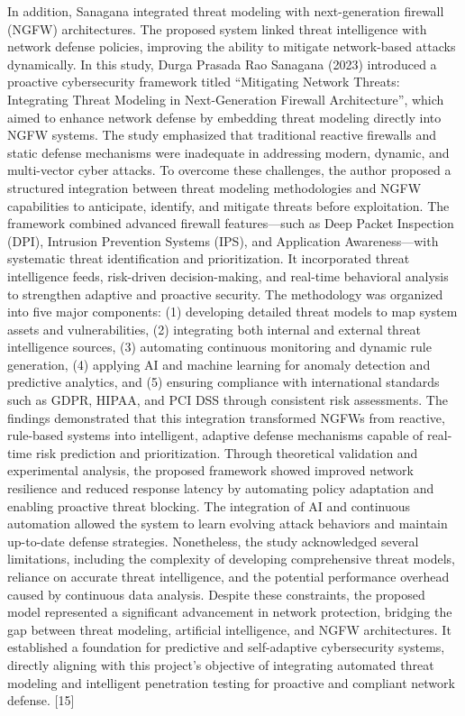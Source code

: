 \documentclass[12pt,a4paper]{report}
\begin{document}
In addition, Sanagana integrated threat modeling with next-generation firewall (NGFW) architectures. The proposed system linked threat intelligence with network defense policies, improving the ability to mitigate network-based attacks dynamically. In this study, Durga Prasada Rao Sanagana (2023) introduced a proactive cybersecurity framework titled “Mitigating Network Threats: Integrating Threat Modeling in Next-Generation Firewall Architecture”, which aimed to enhance network defense by embedding threat modeling directly into NGFW systems. The study emphasized that traditional reactive firewalls and static defense mechanisms were inadequate in addressing modern, dynamic, and multi-vector cyber attacks. To overcome these challenges, the author proposed a structured integration between threat modeling methodologies and NGFW capabilities to anticipate, identify, and mitigate threats before exploitation. The framework combined advanced firewall features—such as Deep Packet Inspection (DPI), Intrusion Prevention Systems (IPS), and Application Awareness—with systematic threat identification and prioritization. It incorporated threat intelligence feeds, risk-driven decision-making, and real-time behavioral analysis to strengthen adaptive and proactive security. The methodology was organized into five major components: (1) developing detailed threat models to map system assets and vulnerabilities, (2) integrating both internal and external threat intelligence sources, (3) automating continuous monitoring and dynamic rule generation, (4) applying AI and machine learning for anomaly detection and predictive analytics, and (5) ensuring compliance with international standards such as GDPR, HIPAA, and PCI DSS through consistent risk assessments. The findings demonstrated that this integration transformed NGFWs from reactive, rule-based systems into intelligent, adaptive defense mechanisms capable of real-time risk prediction and prioritization. Through theoretical validation and experimental analysis, the proposed framework showed improved network resilience and reduced response latency by automating policy adaptation and enabling proactive threat blocking. The integration of AI and continuous automation allowed the system to learn evolving attack behaviors and maintain up-to-date defense strategies. Nonetheless, the study acknowledged several limitations, including the complexity of developing comprehensive threat models, reliance on accurate threat intelligence, and the potential performance overhead caused by continuous data analysis. Despite these constraints, the proposed model represented a significant advancement in network protection, bridging the gap between threat modeling, artificial intelligence, and NGFW architectures. It established a foundation for predictive and self-adaptive cybersecurity systems, directly aligning with this project’s objective of integrating automated threat modeling and intelligent penetration testing for proactive and compliant network defense. [15]
\end{document}
